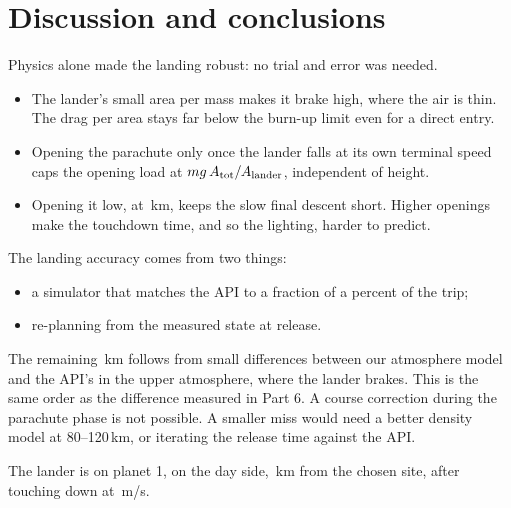 \documentclass[aps,prd,twocolumn,nofootinbib,floatfix,superscriptaddress]{revtex4-2}
\begin{document}
\section{Discussion and conclusions}
Physics alone made the landing robust: no trial and error was needed.
\begin{itemize}
\item The lander's small area per mass makes it brake high, where the air is thin. The drag per area stays far below the burn-up limit even for a direct entry.
\item Opening the parachute only once the lander falls at its own terminal speed caps the opening load at $mg\,A_{\rm tot}/A_{\rm lander}$, independent of height.
\item Opening it low, at \,km, keeps the slow final descent short. Higher openings make the touchdown time, and so the lighting, harder to predict.
\end{itemize}

The landing accuracy comes from two things:
\begin{itemize}
\item a simulator that matches the API to a fraction of a percent of the trip;
\item re-planning from the measured state at release.
\end{itemize}
The remaining \,km follows from small differences between our atmosphere model and the API's in the upper atmosphere, where the lander brakes.
This is the same order as the difference measured in Part 6.
A course correction during the parachute phase is not possible.
A smaller miss would need a better density model at 80--120\,km, or iterating the release time against the API.

The lander is on planet 1, on the day side, \,km from the chosen site, after touching down at \,m/s.


\end{document}
